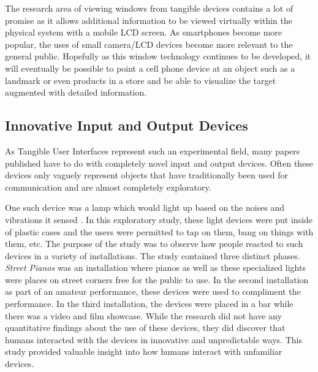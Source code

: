 The research area of viewing windows from tangible devices contains a lot of promise as it allows additional information to be viewed virtually within the physical system with a mobile LCD screen.  As smartphones become more popular, the uses of small camera/LCD devices become more relevant to the general public.  Hopefully as this window technology continues to be developed, it will eventually be possible to point a cell phone device at an object such as a landmark or even products in a store and be able to visualize the target augmented with detailed information.

\subsection{Innovative Input and Output Devices}

As Tangible User Interfaces represent such an experimental field, many papers published have to do with completely novel input and output devices.  Often these devices only vaguely represent objects that have traditionally been used for communication and are almost completely exploratory.

One such device was a lamp which would light up based on the noises and vibrations it sensed \cite{1709908}.  In this exploratory study, these light devices were put inside of plastic cases and the users were permitted to tap on them, bang on things with them, etc. The purpose of the study was to observe how people reacted to such devices in a variety of installations.  The study contained three distinct phases.  \emph{Street Pianos} was an installation where pianos as well as these specialized lights were places on street corners free for the public to use.  In the second installation as part of an amateur performance, these devices were used to compliment the performance.  In the third installation, the devices were placed in a bar while there was a video and film showcase.   While the research did not have any quantitative findings about the use of these devices, they did discover that humans interacted with the devices in innovative and unpredictable ways.  This study provided valuable insight into how humans interact with unfamiliar devices.

